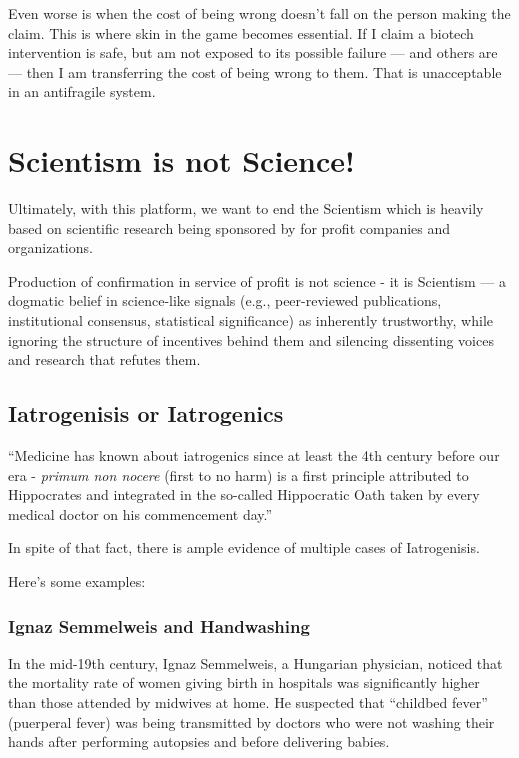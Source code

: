 Even worse is when the cost of being wrong doesn't fall on the person making the claim. This is where skin in the game becomes essential. If I claim a biotech intervention is safe, but am not exposed to its possible failure — and others are — then I am transferring the cost of being wrong to them. That is unacceptable in an antifragile system.

\section{Scientism is not Science!}
Ultimately, with this platform, we want to end the Scientism which is heavily based on scientific research being sponsored by for profit companies and organizations.

Production of confirmation in service of profit is not science - it is Scientism — a dogmatic belief in science-like signals (e.g., peer-reviewed publications, institutional consensus, statistical significance) as inherently trustworthy, while ignoring the structure of incentives behind them and silencing dissenting voices and research that refutes them.

\subsection{Iatrogenisis or Iatrogenics}

``Medicine has known about iatrogenics since at least the 4th century before our era - \emph{primum non nocere} (first to no harm) is a first principle attributed to Hippocrates and integrated in the so-called Hippocratic Oath taken by every medical doctor on his commencement day.''\cite{Taleb2012}

In spite of that fact, there is ample evidence of multiple cases of Iatrogenisis. \cite{VarleyVarma2021}

Here's some examples:

\subsubsection{Ignaz Semmelweis and Handwashing}

In the mid-19th century, Ignaz Semmelweis, a Hungarian physician, noticed that the mortality rate of women giving birth in hospitals was significantly higher than those attended by midwives at home. He suspected that  ``childbed fever'' (puerperal fever) was being transmitted by doctors who were not washing their hands after performing autopsies and before delivering babies.

